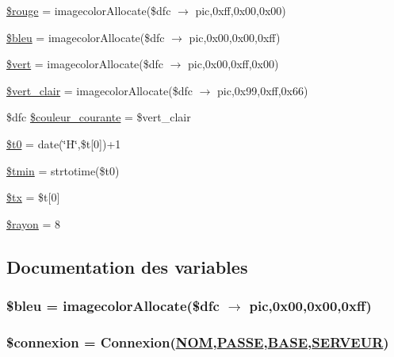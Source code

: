 \begin{CompactItemize}
\hyperlink{feuille__soins_8php_a14}{\$rouge} = imagecolor\-Allocate(\$dfc $\rightarrow$ pic,0xff,0x00,0x00)
\item 
\hyperlink{feuille__soins_8php_a15}{\$bleu} = imagecolor\-Allocate(\$dfc $\rightarrow$ pic,0x00,0x00,0xff)
\item 
\hyperlink{feuille__soins_8php_a16}{\$vert} = imagecolor\-Allocate(\$dfc $\rightarrow$ pic,0x00,0xff,0x00)
\item 
\hyperlink{feuille__soins_8php_a17}{\$vert\_\-clair} = imagecolor\-Allocate(\$dfc $\rightarrow$ pic,0x99,0xff,0x66)
\item 
\$dfc \hyperlink{feuille__soins_8php_a18}{\$couleur\_\-courante} = \$vert\_\-clair
\item 
\hyperlink{feuille__soins_8php_a19}{\$t0} = date(\char`\"{}H\char`\"{},\$t\mbox{[}0\mbox{]})+1
\item 
\hyperlink{feuille__soins_8php_a20}{\$tmin} = strtotime(\$t0)
\item 
\hyperlink{feuille__soins_8php_a21}{\$tx} = \$t\mbox{[}0\mbox{]}
\item 
\hyperlink{feuille__soins_8php_a22}{\$rayon} = 8
\end{CompactItemize}


\subsection{Documentation des variables}
\hypertarget{feuille__soins_8php_a15}{
\subsubsection[\$bleu]{\setlength{\rightskip}{0pt plus 5cm}\$bleu = imagecolor\-Allocate(\$dfc $\rightarrow$ pic,0x00,0x00,0xff)}}
\label{feuille__soins_8php_a15}


\hypertarget{feuille__soins_8php_a3}{
\subsubsection[\$connexion]{\setlength{\rightskip}{0pt plus 5cm}\$connexion = Connexion(\hyperlink{pma__connect_8php_a0}{NOM},\hyperlink{pma__connect_8php_a1}{PASSE},\hyperlink{pma__connect_8php_a3}{BASE},\hyperlink{pma__connect_8php_a2}{SERVEUR})}}
\label{feuille__soins_8php_a3}


